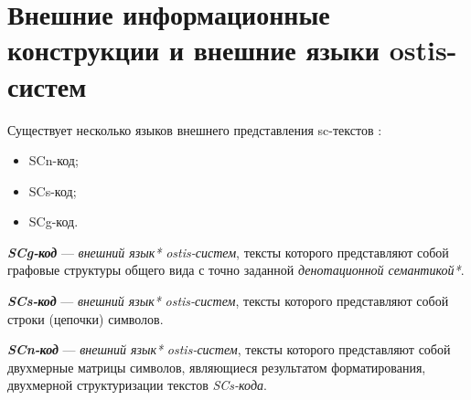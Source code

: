 \section{Внешние информационные конструкции и внешние языки ostis-систем}
\label{sec_external_information_constructs_external_lang}

Существует несколько языков внешнего представления sc-текстов :

\begin{itemize}
    \item SCn-код;
    \item SCs-код;
    \item SCg-код.
\end{itemize}

\textbf{\textit{SCg-код}} --- \textit{внешний язык*} \textit{ostis-систем}, тексты которого представляют собой графовые структуры общего вида с точно заданной \textit{денотационной семантикой*}.

\begin{SCn}

    \begin{scnindent}
    \end{scnindent}

\end{SCn}

\textbf{\textit{SCs-код}} --- \textit{внешний язык*} \textit{ostis-систем}, тексты которого представляют собой строки (цепочки) символов.

\begin{SCn}

    \begin{scnindent}
    \end{scnindent}

\end{SCn}

\textbf{\textit{SCn-код}} --- \textit{внешний язык*} \textit{ostis-систем}, тексты которого представляют собой двухмерные матрицы символов, являющиеся результатом форматирования, двухмерной структуризации текстов \textit{SCs-кода}.

\begin{SCn}

    \begin{scnindent}
    \end{scnindent}

\end{SCn}

